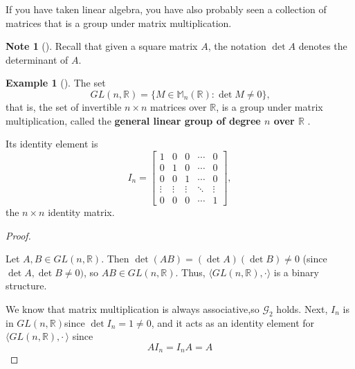 \documentclass[10pt,]{book}
\newcommand{\terminology}[1]{\textbf{#1}}
\theoremstyle{plain}
\theoremstyle{definition}
\theoremstyle{definition}
\newtheorem{note}[theorem]{Note}
\theoremstyle{definition}
\newtheorem{example}[theorem]{Example}
\theoremstyle{definition}
\numberwithin{equation}{section}
\def\R{\mathbb{R}}
\def\M{\mathbb{M}}
\def\G{\mathcal{G}}
\newcommand{\amp}{ & }
\begin{document}
    If you have taken
    linear algebra, you have also probably seen a collection of matrices
    that is a group under matrix multiplication.%
\begin{note}[]\label{note-6}
Recall that given a square matrix \(A\), the notation \(\det A\) denotes the 
    determinant of \(A\).%
\label{notation-32}
\end{note}
\par

  \begin{example}[]\label{gl}
The set
%
\begin{equation*}
GL(n,\R)=\{M\in \M_n(\R):\det M \neq 0\}\text{,}
\end{equation*}
that is, 
the set of invertible \(n\times n\) matrices
        over \(\R\),  is a group under matrix multiplication, called the \terminology{general linear group of degree \(n\) over \(\R\) }.%
\par

Its identity element is %
\begin{equation*}
I_n= \begin{bmatrix}1 \amp  0 \amp  0 \amp  \cdots \amp  0 \\
                0 \amp  1 \amp  0 \amp  \cdots \amp  0 \\
                0 \amp  0 \amp  1 \amp  \cdots \amp  0 \\
                \vdots \amp  \vdots \amp  \vdots \amp  \ddots \amp  \vdots \\
                0 \amp  0 \amp  0 \amp  \cdots \amp  1
                \end{bmatrix},
\end{equation*}
 the \(n \times n\) identity matrix.%
\begin{proof}\hypertarget{proof-7}{}

  Let \(A,B\in GL(n, \R)\). Then \(\det(AB)=(\det A)(\det B) \neq 0\) (since \(\det A, \det B \neq 0)\), so \(AB\in GL(n,\R)\).  Thus, 
  \(\langle GL(n,\R), \cdot\rangle\) is a binary structure.%
\par
We know that matrix multiplication is always associative,so \(\G_2\) holds. Next, \(I_n\) is in \(GL(n,\R)\)since \(\det I_n=1\neq 0\), and it
     acts as an identity element for \(\langle GL(n,\R), \cdot\,\rangle\) since
\begin{equation*}

                AI_n=I_nA = A
              
\end{equation*}


\end{proof}
\end{example}
\end{document}
